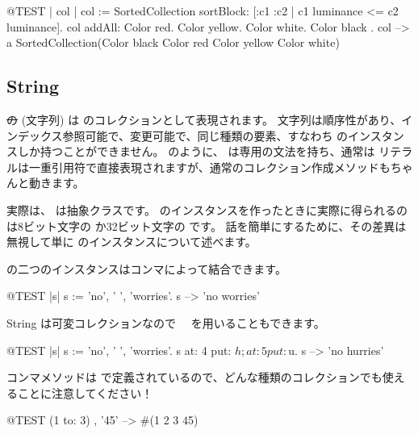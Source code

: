\documentclass[a4paper,10pt,twoside]{book}
\begin{document}
\begin{code}{@TEST | col |}
col := SortedCollection sortBlock: [:c1 :c2 | c1 luminance <= c2 luminance].
col addAll: { Color red. Color yellow. Color white. Color black }.
col --> a SortedCollection(Color black Color red Color yellow Color white)
\end{code}

\subsection{String}
\st の (文字列) は  のコレクションとして表現されます。
文字列は順序性があり、インデックス参照可能で、変更可能で、同じ種類の要素、すなわち  のインスタンスしか持つことができません。
 のように、 は専用の文法を持ち、通常は  リテラルは一重引用符で直接表現されますが、通常のコレクション作成メソッドもちゃんと動きます。


実際は、 は抽象クラスです。
 のインスタンスを作ったときに実際に得られるのは8ビット文字の  か32ビット文字の  です。
話を簡単にするために、その差異は無視して単に  のインスタンスについて述べます。

 の二つのインスタンスはコンマによって結合できます。
\begin{code}{@TEST |s|}
s := 'no', ' ', 'worries'.
s -->  'no worries'
\end{code}

String は可変コレクションなので　 を用いることもできます。

\begin{code}{@TEST |s| s := 'no', ' ', 'worries'.}
s at: 4 put: $h; at: 5 put: $u.
s --> 'no hurries'
\end{code}

コンマメソッドは  で定義されているので、どんな種類のコレクションでも使えることに注意してください！
\begin{code}{@TEST}
(1 to: 3) , '45' --> #(1 2 3 $4 $5)
\end{code}
\end{document}
